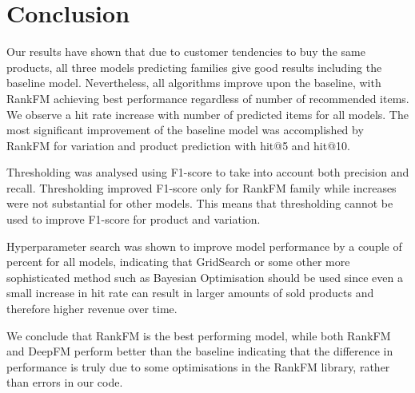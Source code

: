 \documentclass[fleqn,moreauthors,10pt]{ds_report}
\begin{document}
\section*{Conclusion}
Our results have shown that due to customer tendencies to buy the same products, all three models predicting families give good results including the baseline model. Nevertheless, all algorithms improve upon the baseline, with RankFM achieving best performance regardless of number of recommended items. We observe a hit rate increase with number of predicted items for all models. The most significant improvement of the baseline model was accomplished by RankFM for variation and product prediction with hit@5 and hit@10.

Thresholding was analysed using F1-score to take into account both precision and recall.
Thresholding improved F1-score only for RankFM family while increases were not substantial for other models.
This means that thresholding cannot be used to improve F1-score for product and variation.

Hyperparameter search was shown to improve model performance by a couple of percent for all models, indicating that GridSearch or some other more sophisticated method such as Bayesian Optimisation should be used since even a small increase in hit rate can result in larger amounts of sold products and therefore higher revenue over time.

We conclude that RankFM is the best performing model, while both RankFM and DeepFM perform better than the baseline indicating that the difference in performance is truly due to some optimisations in the RankFM library, rather than errors in our code.




\vspace*{-15pt}


\end{document}
